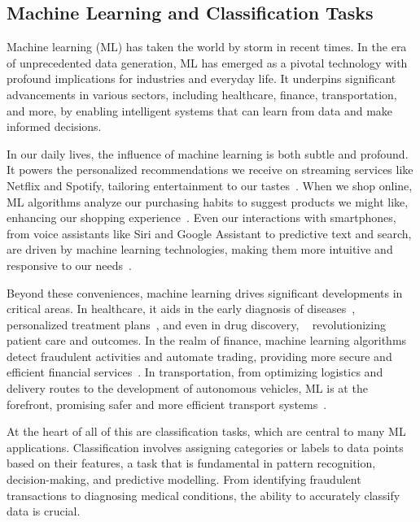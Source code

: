 \documentclass[letterpaper,10pt]{article}
\begin{document}
\subsection{Machine Learning and Classification Tasks}
Machine learning (ML) has taken the world by storm in recent times. In the era of unprecedented data generation, ML has emerged as a pivotal technology with profound implications for industries and everyday life. It underpins significant advancements in various sectors, including healthcare, finance, transportation, and more, by enabling intelligent systems that can learn from data and make informed decisions. \par
In our daily lives, the influence of machine learning is both subtle and profound. It powers the personalized recommendations we receive on streaming services like Netflix and Spotify, tailoring entertainment to our tastes~\cite{NetflixRecommendations,SpotifyPlaylistGen}. When we shop online, ML algorithms analyze our purchasing habits to suggest products we might like, enhancing our shopping experience~\cite{MediaRecommendationSystemsSurvey}. Even our interactions with smartphones, from voice assistants like Siri and Google Assistant to predictive text and search, are driven by machine learning technologies, making them more intuitive and responsive to our needs~\cite{GoogleAssistantLookAndTalk, SiriML}.
\par
Beyond these conveniences, machine learning drives significant developments in critical areas. In healthcare, it aids in the early diagnosis of diseases~\cite{diabetesclassification}, personalized treatment plans~\cite{PersonalisedMedicineDeepLearning}, and even in drug discovery, ~\cite{DrugDiscoveryDeepLearning} revolutionizing patient care and outcomes. In the realm of finance, machine learning algorithms detect fraudulent activities and automate trading, providing more secure and efficient financial services~\cite{FinanceFraudDeepLearning}. In transportation, from optimizing logistics and delivery routes to the development of autonomous vehicles, ML is at the forefront, promising safer and more efficient transport systems~\cite{TransportationLogisticsML}. \par
At the heart of all of this are classification tasks, which are central to many ML applications. Classification involves assigning categories or labels to data points based on their features, a task that is fundamental in pattern recognition, decision-making, and predictive modelling. From identifying fraudulent transactions to diagnosing medical conditions, the ability to accurately classify data is crucial.
\end{document}
